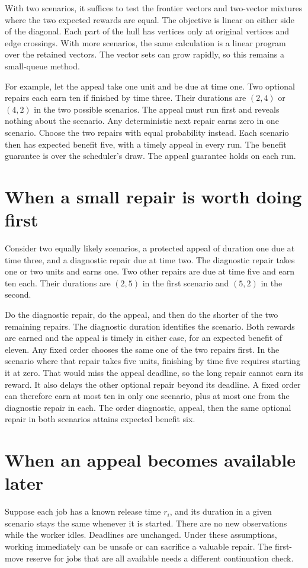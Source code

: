 \documentclass[11pt]{article}
\begin{document}
With two scenarios, it suffices to test the frontier vectors and
two-vector mixtures where the two expected rewards are equal.
The objective is linear on either side of the diagonal. Each
part of the hull has vertices only at original vertices and
edge crossings. With more scenarios, the same calculation
is a linear program over the retained vectors. The vector sets
can grow rapidly, so this remains a small-queue method.

For example, let the appeal take one unit and be due at time one.
Two optional repairs each earn ten if finished by time three.
Their durations are $(2,4)$ or $(4,2)$ in the two possible scenarios.
The appeal must run first and reveals nothing about the scenario.
Any deterministic next repair earns zero in one scenario.
Choose the two repairs with equal probability instead. Each scenario
then has expected benefit five, with a timely appeal in every run.
The benefit guarantee is over the scheduler's draw. The appeal
guarantee holds on each run.

\section{When a small repair is worth doing first}
Consider two equally likely scenarios, a protected appeal of
duration one due at time three, and a diagnostic repair due at
time two. The diagnostic repair takes one or two units and
earns one. Two other repairs are due at time five and earn ten
each. Their durations are $(2,5)$ in the first scenario and
$(5,2)$ in the second.

Do the diagnostic repair, do the appeal, and then do the shorter
of the two remaining repairs. The diagnostic duration identifies
the scenario. Both rewards are earned and the appeal is timely
in either case, for an expected benefit of eleven.
Any fixed order chooses the same one of the two repairs first.
In the scenario where that repair takes five units, finishing
by time five requires starting it at zero. That would miss the
appeal deadline, so the long repair cannot earn its reward. It also delays the other optional repair beyond its
deadline. A fixed order can therefore earn at most ten in only
one scenario, plus at most one from the diagnostic repair in
each. The order diagnostic, appeal, then the same optional
repair in both scenarios attains expected benefit six.

\section{When an appeal becomes available later}
Suppose each job has a known release time $r_i$, and its duration
in a given scenario stays the same whenever it is started. There
are no new observations while the worker idles. Deadlines are
unchanged. Under these assumptions, working immediately can be
unsafe or can sacrifice a valuable repair. The first-move reserve
for jobs that are all available needs a different continuation check.
\end{document}

